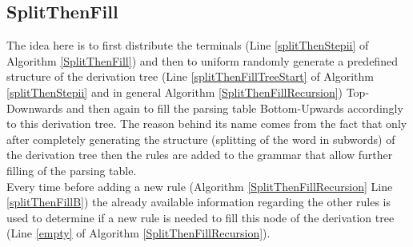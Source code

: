 \noindent
{}



\pagebreak
\subsection{SplitThenFill}

The idea here is to first distribute the terminals (Line \ref{splitThenStepii} of Algorithm \ref{SplitThenFill}) and then to uniform randomly generate a predefined structure of the derivation tree (Line \ref{splitThenFillTreeStart} of Algorithm \ref{splitThenStepii} and in general Algorithm \ref{SplitThenFillRecursion}) Top-Downwards and then again to fill the parsing table Bottom-Upwards accordingly to this derivation tree. The reason behind its name comes from the fact that only after completely generating the structure (splitting of the word in subwords) of the derivation tree then the rules are added to the grammar that allow further filling of the parsing table. \\
Every time before adding a new rule (Algorithm \ref{SplitThenFillRecursion} Line \ref{splitThenFillB}) the already available information regarding the other rules is used to determine if a new rule is needed to fill this node of the derivation tree (Line \ref{empty} of Algorithm \ref{SplitThenFillRecursion}).\\


